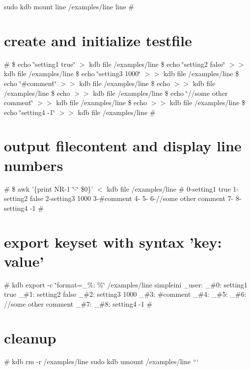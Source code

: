 sudo kdb mount line /examples/line line \# \section*{create and initialize testfile}

\# \$ echo \char`\"{}setting1 true\char`\"{} $>$ {\ttfamily kdb file /examples/line} \$ echo \char`\"{}setting2 false\char`\"{} $>$$>$ {\ttfamily kdb file /examples/line} \$ echo \char`\"{}setting3 1000\char`\"{} $>$$>$ {\ttfamily kdb file /examples/line} \$ echo \char`\"{}\#comment\char`\"{} $>$$>$ {\ttfamily kdb file /examples/line} \$ echo $>$$>$ {\ttfamily kdb file /examples/line} \$ echo $>$$>$ {\ttfamily kdb file /examples/line} \$ echo \char`\"{}//some other comment\char`\"{} $>$$>$ {\ttfamily kdb file /examples/line} \$ echo $>$$>$ {\ttfamily kdb file /examples/line} \$ echo \char`\"{}setting4 -\/1\char`\"{} $>$$>$ {\ttfamily kdb file /examples/line} \# \section*{output filecontent and display line numbers}

\# \$ awk '\{print N\+R-\/1 \char`\"{}-\/\char`\"{} \$0\}' $<$ {\ttfamily kdb file /examples/line} \# 0-\/setting1 true 1-\/setting2 false 2-\/setting3 1000 3-\/\#comment 4-\/ 5-\/ 6-\///some other comment 7-\/ 8-\/setting4 -\/1 \# \section*{export keyset with syntax 'key\+: value'}

\# kdb export -\/c \char`\"{}format=\+\_\+\%\+: \%\char`\"{} /examples/line simpleini \+\_\+user\+: \+\_\+\#0\+: setting1 true \+\_\+\#1\+: setting2 false \+\_\+\#2\+: setting3 1000 \+\_\+\#3\+: \#comment \+\_\+\#4\+: \+\_\+\#5\+: \+\_\+\#6\+: //some other comment \+\_\+\#7\+: \+\_\+\#8\+: setting4 -\/1 \# \section*{cleanup}

\# kdb rm -\/r /examples/line sudo kdb umount /examples/line ``` 